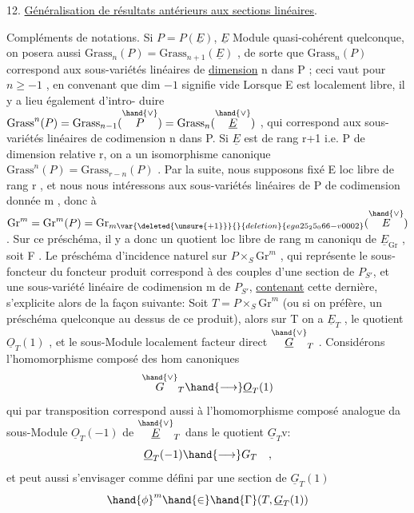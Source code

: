 
12. \uline{Généralisation de résultats antérieurs aux sections linéaires}.

Compléments de notations. Si $P = P(\underline{E})$, $\underline{E}$ Module quasi-cohérent
quelconque, on posera aussi $\mathrm{Grass}_n(P) = \mathrm{Grass}_{n+1}(\underline{E})$ , de sorte que
$\mathrm{Grass}_n(P)$ correspond aux sous-variétés linéaires de \uline{dimension} n dans
P ; ceci vaut pour $n \geq -1$ , en convenant que dim $-1$ signifie vide
Lorsque E est localement libre,  il y a lieu également d'intro-%
duire $\mathrm{Grass}^n(P) = \mathrm{Grass}_{n-1}(\overset{\hand{\vee}}{P}) = \mathrm{Grass}_n(\overset{\hand{\vee}}{\underline{E}})$ , qui correspond aux sous-%
variétés linéaires de codimension n dans P. Si $\underline{E}$ est de rang r+1 i.e.
P de dimension relative r, on a un isomorphisme canonique
$\mathrm{Grass}^n(P) = \mathrm{Grass}_{r-n}(P)$ . Par la suite, nous supposons fixé E loc
libre de rang r , et nous nous intéressons aux sous-variétés linéaires
de P de codimension donnée m , donc à $\mathrm{Gr}^m = \mathrm{Gr}^m(P) = \mathrm{Gr}_{m\var{\deleted{\unsure{+1}}}{}{deletion}{ega25_25_066-v0002}}(\overset{\hand{\vee}}{E})$ .
Sur ce préschéma, il y a donc un quotient  loc libre de rang m canoniqu
de $\underline{E}_{\mathrm{Gr}}$ , soit F .  Le préschéma d'incidence naturel
sur $P\times_S \mathrm{Gr}^m$ , qui représente le sous-foncteur du foncteur produit
correspond à des couples d'une section de $P_{S'}$, et une sous-variété
linéaire de codimension m de $P_{S'}$, \uline{contenant} cette dernière, s'explicite
alors de la façon suivante: Soit $T=P\times_S \mathrm{Gr}^m$ (ou si on préfère, un
préschéma quelconque au dessus de ce produit), alors sur  T on a
$\underline{E}_T$ , le quotient $\underline{O}_T(1)$ , et le sous-Module localement facteur direct
$\overset{\hand{\vee}}{\underline{G}}_T$ . Considérons l'homomorphisme composé des hom canoniques
\[ \overset{\hand{\vee}}{G}_T \hand{\longrightarrow} \underline{O}_T(1) \]
qui par transposition correspond aussi à l'homomorphisme composé
analogue da sous-Module $\underline{O}_T(-1)$ de $\overset{\hand{\vee}}{\underline{E}}_T$ dans le quotient $\underline{G}_T\mathrm{v}$:
\[ \underline{O}_T(-1) \hand{\longrightarrow} G_T \quad , \]
et peut aussi s'envisager comme défini par une section de $\underline{G}_T(1)$
\[ \hand{\phi}^m \hand{\in} \hand{\Gamma}(T, \underline{G}_T(1)) \]

